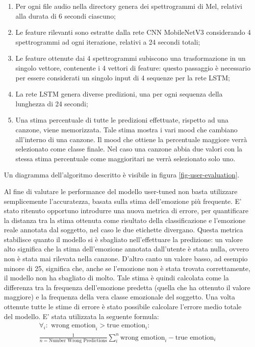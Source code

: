 \documentclass[11pt]{report}
\begin{document}
\begin{enumerate}
    \item Per ogni file audio nella directory genera dei spettrogrammi di Mel, relativi alla durata di 6 secondi ciascuno;
    
    \item Le feature rilevanti sono estratte dalla rete CNN MobileNetV3 considerando 4 spettrogrammi ad ogni iterazione, relativi a 24 secondi totali;
    
    \item Le feature ottenute dai 4 spettrogrammi subiscono una trasformazione in un singolo vettore, contenente i 4 vettori di feature: questo passaggio è necessario per essere considerati un singolo input di 4 sequenze per la rete LSTM;
    
    \item  La rete LSTM genera diverse predizioni, una per ogni sequenza della lunghezza di 24 secondi;
    
    \item Una stima percentuale di tutte le predizioni effettuate, rispetto ad una canzone, viene memorizzata. Tale stima mostra i vari mood che cambiano all'interno di una canzone. Il mood che ottiene la percentuale maggiore verrà selezionato come classe finale. Nel caso una canzone abbia due valori con la stessa stima percentuale come maggioritari ne verrà selezionato solo uno.
    
    
\end{enumerate}

Un diagramma dell'algoritmo descritto è visibile in figura \ref{fig-user-evaluation}.


\newpage

Al fine di valutare le performance del modello user-tuned non basta utilizzare semplicemente l'accuratezza, basata sulla stima dell'emozione più frequente. E' stato ritenuto opportuno introdurre una nuova metrica di errore, per quantificare la distanza tra la stima ottenuta come risultato della classificazione e l'emozione reale annotata dal soggetto, nel caso le due etichette divergano. Questa metrica stabilisce quanto il modello si è sbagliato nell'effettuare la predizione: un valore alto significa che la stima dell'emozione annotata dall'utente è stata nulla, ovvero non è stata mai rilevata nella canzone. D'altro canto un valore basso, ad esempio minore di 25, significa che, anche se l'emozione non è stata trovata correttamente, il modello non ha sbagliato di molto. Tale stima è quindi calcolata come la differenza tra la frequenza dell'emozione predetta (quella che ha ottenuto il valore maggiore) e la frequenza della vera classe emozionale del soggetto. Una volta ottenute tutte le stime di errore è stato possibile calcolare l'errore medio totale del modello. E' stata utilizzata la seguente formula:
\begin{equation}
\begin{multlined}
\forall_i: \text{ wrong emotion}_i > \text{true emotion}_i: \\
\frac{1}{n  = \text{Number Wrong Predictions}} \sum_{i}^n \text{wrong emotion}_i - \text{true emotion}_i
\end{multlined}
\end{equation}
\end{document}
